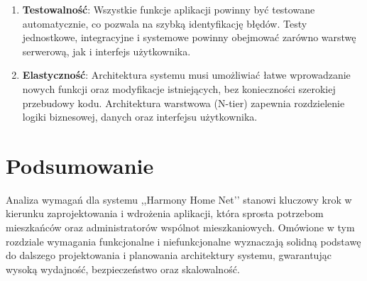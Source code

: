 \begin{enumerate}[label=\arabic*.,labelwidth=\widthof{10}]
	\item \textbf{Testowalność}: Wszystkie funkcje aplikacji powinny być testowane automatycznie, co pozwala na szybką identyfikację błędów. Testy jednostkowe, integracyjne i systemowe powinny obejmować zarówno warstwę serwerową, jak i interfejs użytkownika.

	\item \textbf{Elastyczność}: Architektura systemu musi umożliwiać łatwe wprowadzanie nowych funkcji oraz modyfikacje istniejących, bez konieczności szerokiej przebudowy kodu. Architektura warstwowa (N-tier) zapewnia rozdzielenie logiki biznesowej, danych oraz interfejsu użytkownika.

\end{enumerate}

\section{Podsumowanie}

Analiza wymagań dla systemu ,,Harmony Home Net’’ stanowi kluczowy krok w kierunku zaprojektowania i wdrożenia aplikacji, która sprosta potrzebom mieszkańców oraz administratorów wspólnot mieszkaniowych. Omówione w tym rozdziale wymagania funkcjonalne i niefunkcjonalne wyznaczają solidną podstawę do dalszego projektowania i planowania architektury systemu, gwarantując wysoką wydajność, bezpieczeństwo oraz skalowalność.

